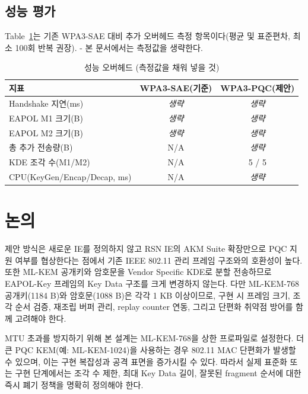 \documentclass[11pt]{article}
\theoremstyle{definition}
\theoremstyle{plain}
\begin{document}
\subsection{성능 평가}
Table~\ref{tab:perf}는 기존 WPA3-SAE 대비 추가 오버헤드 측정 항목이다(평균 및
표준편차, 최소 100회 반복 권장). - 본 문서에서는 측정값을 생략한다.

\begin{table}[H]\centering
\caption{성능 오버헤드 (측정값을 채워 넣을 것)}\label{tab:perf}
\small
\begin{tabular}{@{}lcc@{}}
\toprule
지표 & WPA3-SAE(기준) & WPA3-PQC(제안) \\ \midrule
Handshake 지연(ms) & \textit{생략} & \textit{생략} \\
EAPOL M1 크기(B) & \textit{생략} & \textit{생략} \\
EAPOL M2 크기(B) & \textit{생략} & \textit{생략} \\
총 추가 전송량(B) & N/A & \textit{생략} \\
KDE 조각 수(M1/M2) & N/A & 5 / 5 \\
CPU(KeyGen/Encap/Decap, ms) & N/A & \textit{생략} \\
\bottomrule
\end{tabular}
\end{table}

\section{논의}\label{sec:discussion}
제안 방식은 새로운 IE를 정의하지 않고 RSN IE의 AKM Suite 확장만으로 PQC 지원
여부를 협상한다는 점에서 기존 IEEE 802.11 관리 프레임 구조와의 호환성이 높다.
또한 ML-KEM 공개키와 암호문을 Vendor Specific KDE로 분할 전송하므로 EAPOL-Key
프레임의 Key Data 구조를 크게 변경하지 않는다. 다만 ML-KEM-768 공개키(1184 B)와
암호문(1088 B)은 각각 1 KB 이상이므로, 구현 시 프레임 크기, 조각 순서 검증,
재조립 버퍼 관리, replay counter 연동, 그리고 단편화 취약점 방어를 함께
고려해야 한다.

MTU 초과를 방지하기 위해 본 설계는 ML-KEM-768을 상한 프로파일로 설정한다. 더 큰
PQC KEM(예: ML-KEM-1024)을 사용하는 경우 802.11 MAC 단편화가 발생할 수 있으며,
이는 구현 복잡성과 공격 표면을 증가시킬 수 있다. 따라서 실제 표준화 또는 구현
단계에서는 조각 수 제한, 최대 Key Data 길이, 잘못된 fragment 순서에 대한 즉시 폐기
정책을 명확히 정의해야 한다.
\end{document}
